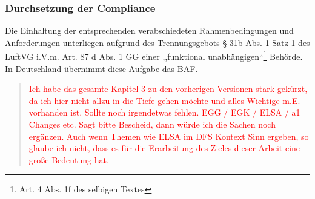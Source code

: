 





\pagebreak
\subsubsection{Durchsetzung der Compliance}

    Die Einhaltung der entsprechenden verabschiedeten Rahmenbedingungen und Anforderungen unterliegen aufgrund des Trennungsgebots § 31b Abs. 1 Satz 1 des \ac{LuftVG} i.V.m. Art. 87 d Abs. 1 \ac{GG} einer ,,funktional unabhängigen``\footnote{Art. 4 Abs. 1f des selbigen Textes} Behörde. \cite[S. 14]{eu_ses_studie} 
    In Deutschland übernimmt diese Aufgabe das \acf{BAF}.



\begin{quote}
    \textcolor{red}{
        Ich habe das gesamte Kapitel 3 zu den vorherigen Versionen stark gekürzt, da ich hier nicht allzu in die Tiefe gehen möchte und alles Wichtige m.E. vorhanden ist. Sollte noch irgendetwas fehlen. 
        EGG / EGK / ELSA / a1 Changes etc.
        Sagt bitte Bescheid, dann würde ich die Sachen noch ergänzen. 
        Auch wenn Themen wie ELSA im DFS Kontext Sinn ergeben, so glaube ich nicht, dass es für die Erarbeitung des Zieles dieser Arbeit eine große Bedeutung hat.    
    }
\end{quote}


